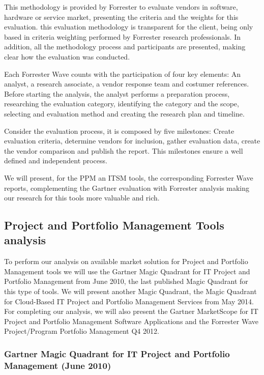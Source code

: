 This methodology is provided by Forrester to evaluate vendors in software, hardware or service market, presenting the criteria and the weights for this evaluation. this evaluation methodology is transparent for the client, being only based in criteria weighting performed by Forrester research professionals. In addition, all the methodology process and participants are presented, making clear how the evaluation was conducted.\par
Each Forrester Wave counts with the participation of four key elements: An analyst, a research associate, a vendor response team and costumer references. Before starting the analysis, the analyst performs a preparation process, researching the evaluation category, identifying the category and the scope, selecting and evaluation method and creating the research plan and timeline.\par
Consider the evaluation process, it is composed by five milestones: Create evaluation criteria, determine vendors for inclusion, gather evaluation data, create the vendor comparison and publish the report. This milestones ensure a well defined and independent process.\par
We will present, for the PPM an ITSM tools, the corresponding Forrester Wave reports, complementing the Gartner evaluation with Forrester analysis making our research for this tools more valuable and rich.\par 

\subsection{Project and Portfolio Management Tools analysis}

To perform our analysis on available market solution for Project and Portfolio Management tools we will use the Gartner Magic Quadrant for IT Project and Portfolio Management from June 2010, the last published Magic Quadrant for this type of tools. We will present another Magic Quadrant, the Magic Quadrant for Cloud-Based IT Project and Portfolio Management Services from May 2014. For completing our analysis, we will also present the Gartner MarketScope for IT Project and Portfolio Management Software Applications and the Forrester Wave Project/Program Portfolio Management Q4 2012.\par 

\subsubsection{Gartner Magic Quadrant for IT Project and Portfolio Management (June 2010)}

